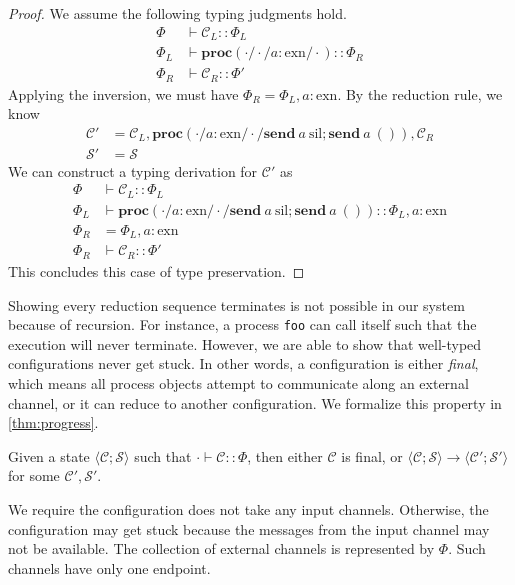 \documentclass[12pt, openany]{memoir}
\newcommand*{\send}[2]{\textbf{send}\ #1\ #2}
\newcommand*{\procObj}[4]{\textbf{proc}(#1/#2/#3/#4)}
\newcommand*{\config}[0]{\mathcal{C}}
\newcommand*{\cancelSet}[0]{\mathcal{S}}
\begin{document}
\begin{proof}
  We assume the following typing judgments hold.
  \begin{align*}
    \Phi & \vdash \config_L :: \Phi_L \\
    \Phi_L & \vdash \procObj{\cdot}{\cdot}{a : \text{exn}}{\cdot} :: \Phi_R \\
    \Phi_R & \vdash \config_R :: \Phi'
  \end{align*}
  Applying the inversion, we must have $\Phi_R = \Phi_L, a : \text{exn}$. By the reduction rule, we know
  \begin{align*}
    \config' &= \config_L, \procObj{\cdot}{a : \text{exn}}{\cdot}{\send{a}{\text{sil}}; \send{a}{()}}, \config_R \\
    \cancelSet' &= \cancelSet
  \end{align*}
  We can construct a typing derivation for $\config'$ as
  \begin{align*}
    \Phi & \vdash \config_L :: \Phi_L \\
    \Phi_L & \vdash \procObj{\cdot}{a : \text{exn}}{\cdot}{\send{a}{\text{sil}}; \send{a}{()}} :: \Phi_L, a : \text{exn} \\
    \Phi_R & = \Phi_L, a : \text{exn} \\
    \Phi_R & \vdash \config_R :: \Phi'
  \end{align*}
  This concludes this case of type preservation.
\end{proof}
Showing every reduction sequence terminates is not possible in our system because of recursion. 
For instance, a process \texttt{foo} can call itself such that the execution will never terminate.
However, we are able to show that well-typed configurations never get stuck.
In other words, a configuration is either \textit{final}, which means all process objects attempt to communicate along an external channel,
or it can reduce to another configuration. We formalize this property in \cref{thm:progress}.
\begin{theorem}\label{thm:progress}
  Given a state $\langle \config; \cancelSet \rangle$ such that $\cdot \vdash \config :: \Phi$, then either $\config$ is final, or 
  $\langle \config; \cancelSet \rangle \longrightarrow \langle \config'; \cancelSet' \rangle$ for some $\config', \cancelSet'$.
\end{theorem}
We require the configuration does not take any input channels. 
Otherwise, the configuration may get stuck because the messages from the input channel may not be available.
The collection of external channels is represented by $\Phi$. Such channels have only one endpoint.
\end{document}
